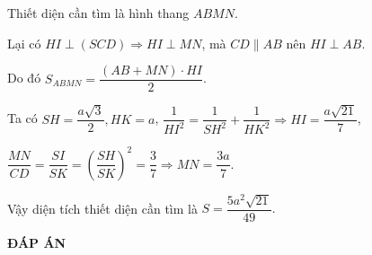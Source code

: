 \begin{bt}
{\begin{enumerate}
			Thiết diện cần tìm là hình thang $ABMN$.
			
			Lại có $HI\perp (SCD)\Rightarrow HI\perp MN$, mà $CD\parallel AB$ nên $HI\perp AB$.
			
			Do đó $S_{ABMN}=\dfrac{(AB+MN)\cdot HI}{2}$.
			
			Ta có $SH =\dfrac{a\sqrt{3}}{2}, HK=a$, $\dfrac{1}{HI^2}=\dfrac{1}{SH^2}+\dfrac{1}{HK^2}\Rightarrow HI=\dfrac{a\sqrt{21}}{7}$, 
			
			$\dfrac{MN}{CD}=\dfrac{SI}{SK}=\left (\dfrac{SH}{SK}\right )^2=\dfrac{3}{7}\Rightarrow MN=\dfrac{3a}{7}$.
			
			Vậy diện tích thiết diện cần tìm là $S=\dfrac{5a^2\sqrt{21}}{49}.$
		
		\end{enumerate}
	
	}
\end{bt}

\newpage
\begin{center}
	\textbf{ĐÁP ÁN}
\end{center}
\begin{multicols}{10}
	
\end{multicols}

	